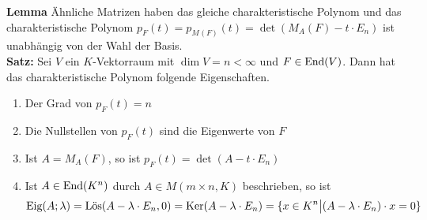 \textbf{Lemma} Ähnliche Matrizen haben das gleiche charakteristische Polynom und das charakteristische Polynom \quad $p_F(t) = p_{M_{}^{}(F)}(t) = \det(M_{A}^{}(F) - t \cdot E_n)$ \quad ist unabhängig von der Wahl der Basis.\\
\textbf{Satz:} \quad Sei $V$ ein $K$-Vektorraum mit $\dim V = n < \infty$ und $F \in \text{End}(V)$. Dann hat das charakteristische Polynom folgende Eigenschaften.
\begin{enumerate}[{(}a{)}]
    \vspace{-5pt}
    \item Der Grad von $p_F(t) = n$
    \vspace{-5pt}
    \item Die Nullstellen von $p_F(t)$ sind die Eigenwerte von $F$
    \vspace{-5pt}
    \item Ist $A = M_{A}^{}(F)$, so ist $p_F(t) = \det(A - t \cdot E_n)$
    \vspace{-5pt}
    \item Ist $A \in \text{End}(K^n)$ durch $A \in M(m\times n,K)$ beschrieben, so ist
    \vspace{-5pt} 
    \begin{align*}
        \text{Eig}(A;\lambda) = \text{Lös}(A - \lambda \cdot E_n,0) = \text{Ker}(A - \lambda \cdot E_n) = \{x \in K^n \big\vert (A - \lambda \cdot E_n) \cdot x = 0\}
    \end{align*}
\end{enumerate}
\vspace{-10pt}
